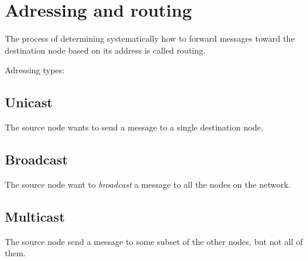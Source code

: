\section{Adressing and routing}

The process of determining systematically how to forward 
messages toward the destination node based on its 
address is called routing. \cite{PetersonDavie:2003}

Adressing types: 

	\subsection{Unicast}
	The source node wants to send a message to a single destination node.
	
	\subsection{Broadcast}
	The source node want to \emph{broadcast} a message to all the 
	nodes on the network.
	
	\subsection{Multicast}
	The source node send a message to some subset of the 
	other nodes, but not all of them.
	

	
	
	
